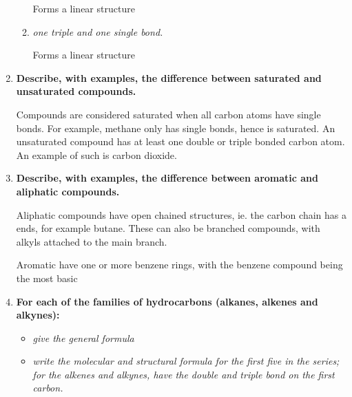 \documentclass{report}
\begin{document}
\begin{enumerate}
\begin{enumerate}
				Forms a linear structure

			\item \textit{one triple and one single bond.}
				\begin{center}
				\end{center}

				Forms a linear structure

		\end{enumerate}
		    
		\item \textbf{Describe, with examples, the difference between saturated and unsaturated compounds.}

			Compounds are considered saturated when all carbon atoms have single bonds. For example, methane only has single bonds, hence is saturated. An unsaturated compound has at least one double or triple bonded carbon atom. An example of such is carbon dioxide.
		    
		\item \textbf{Describe, with examples, the difference between aromatic and aliphatic compounds.}

			Aliphatic compounds have open chained structures, ie. the carbon chain has a ends, for example butane. These can also be branched compounds, with alkyls attached to the main branch.

			Aromatic have one or more benzene rings, with the benzene compound being the most basic
		    
\newpage

		\item \textbf{For each of the families of hydrocarbons (alkanes, alkenes and alkynes):}

			\begin{itemize}
				\item \textit{give the general formula}
				\item \textit{write the molecular and structural formula for the first five in the series; for the alkenes and alkynes, have the double and triple bond on the first carbon.}
			\end{itemize}
				

\end{enumerate}
\end{document}
